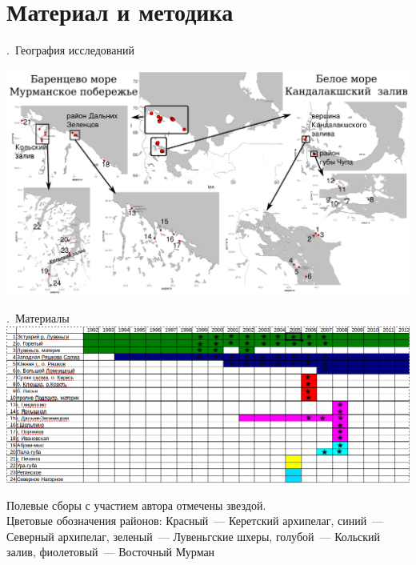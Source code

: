 \documentclass[aspectratio=169, xcolor=table]{beamer}
\begin{document}
		\section[Методы]{Материал и методика}
\begin{frame}{\insertpagenumber.\ География исследований}
 \begin{center}
	\includegraphics[height=.8\textheight]{./map_White_Barents.pdf}
 \end{center}
\end{frame}

\begin{frame}{\insertpagenumber.\ Материалы}
	\includegraphics[width=\textwidth]{./timeline_field.png}

{\tiny Полевые сборы с участием автора отмечены звездой.\\
Цветовые обозначения районов: Красный~--- Керетский архипелаг, синий~--- Северный архипелаг, зеленый~--- Лувеньгские шхеры, голубой~--- Кольский залив, фиолетовый~--- Восточный Мурман}
\end{frame}
\end{document}
